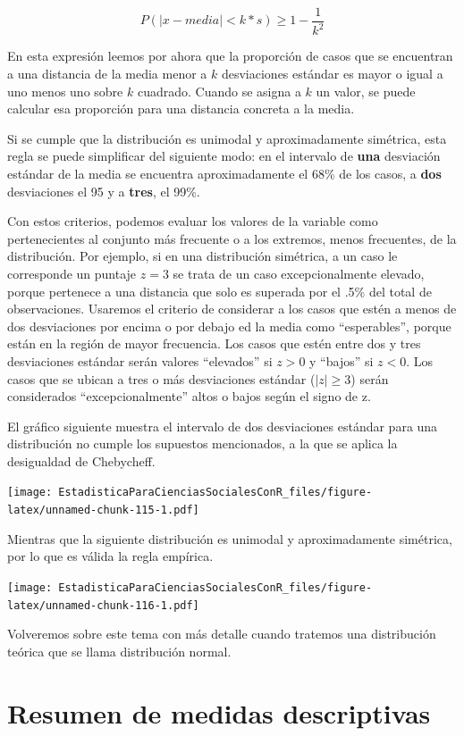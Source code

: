 \documentclass[]{book}
\begin{document}
\[P(|x-media|<k*s) \geq 1-\frac{1}{k^2}\]

En esta expresión leemos por ahora que la proporción de casos que se encuentran a una distancia de la media menor a \(k\) desviaciones estándar es mayor o igual a uno menos uno sobre \(k\) cuadrado. Cuando se asigna a \(k\) un valor, se puede calcular esa proporción para una distancia concreta a la media.

Si se cumple que la distribución es unimodal y aproximadamente simétrica, esta regla se puede simplificar del siguiente modo:
en el intervalo de \textbf{una} desviación estándar de la media se encuentra aproximadamente el 68\% de los casos, a \textbf{dos} desviaciones el 95 y a \textbf{tres}, el 99\%.

Con estos criterios, podemos evaluar los valores de la variable como pertenecientes al conjunto más frecuente o a los extremos, menos frecuentes, de la distribución. Por ejemplo, si en una distribución simétrica, a un caso le corresponde un puntaje \(z=3\) se trata de un caso excepcionalmente elevado, porque pertenece a una distancia que solo es superada por el .5\% del total de observaciones. Usaremos el criterio de considerar a los casos que estén a menos de dos desviaciones por encima o por debajo ed la media como ``esperables'', porque están en la región de mayor frecuencia. Los casos que estén entre dos y tres desviaciones estándar serán valores ``elevados'' si \(z>0\) y ``bajos'' si \(z<0\). Los casos que se ubican a tres o más desviaciones estándar (\(|z|\geq 3\)) serán considerados ``excepcionalmente'' altos o bajos según el signo de z.

El gráfico siguiente muestra el intervalo de dos desviaciones estándar para una distribución no cumple los supuestos mencionados, a la que se aplica la desigualdad de Chebycheff.

\texttt{[image: EstadisticaParaCienciasSocialesConR\_files/figure-latex/unnamed-chunk-115-1.pdf]}

Mientras que la siguiente distribución es unimodal y aproximadamente simétrica, por lo que es válida la regla empírica.

\texttt{[image: EstadisticaParaCienciasSocialesConR\_files/figure-latex/unnamed-chunk-116-1.pdf]}

Volveremos sobre este tema con más detalle cuando tratemos una distribución teórica que se llama distribución normal.

\hypertarget{resumen-de-medidas-descriptivas}{%
\section{Resumen de medidas descriptivas}\label{resumen-de-medidas-descriptivas}}
\end{document}
